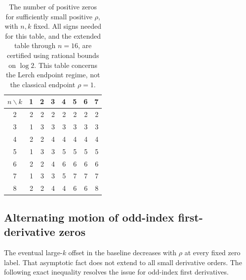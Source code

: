 \begin{table}[htbp]
\centering\small
\begin{tabular}{c|rrrrrrr}
\toprule
$n\backslash k$&1&2&3&4&5&6&7\\\midrule
2&2&2&2&2&2&2&2\\
3&1&3&3&3&3&3&3\\
4&2&2&4&4&4&4&4\\
5&1&3&3&5&5&5&5\\
6&2&2&4&6&6&6&6\\
7&1&3&3&5&7&7&7\\
8&2&2&4&4&6&6&8\\
\bottomrule
\end{tabular}
\caption{The number of positive zeros for sufficiently small positive
$\rho$, with $n,k$ fixed. All signs needed for this table, and the extended
table through $n=16$, are certified using rational bounds on $\log2$.
This table concerns the Lerch endpoint regime, not the classical endpoint
$\rho=1$.}
\label{tab:small-rho}
\end{table}

\subsection{Alternating motion of odd-index first-derivative zeros}
The eventual large-$k$ offset in the baseline decreases with $\rho$ at
every fixed zero label. That asymptotic fact does not extend to all
small derivative orders. The following exact inequality resolves the
issue for odd-index first derivatives.

